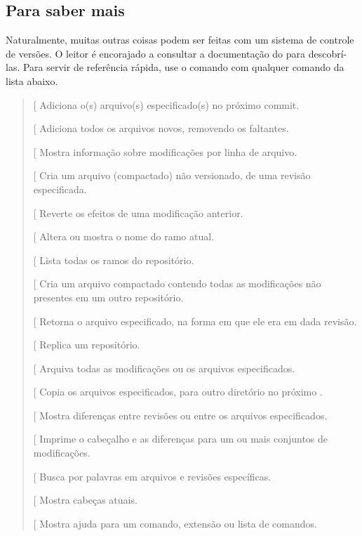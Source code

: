 \documentclass[a4paper,10pt,brazil]{sphinxmanual}
\begin{document}
\subsection{Para saber mais}
\label{capferr:para-saber-mais}
Naturalmente, muitas outras coisas podem ser feitas com um sistema
de controle de versões. O leitor é encorajado a consultar a
documentação do  para descobrí-las. Para servir de
referência rápida, use o comando  com
qualquer comando da lista abaixo.
\begin{quote}

{[}\code{add}{]} Adiciona o(s) arquivo(s) especificado(s) no próximo
commit.

{[}\code{addremove}{]} Adiciona todos os arquivos novos, removendo os
faltantes.

{[}\code{annotate}{]} Mostra informação sobre modificações por linha de
arquivo.

{[}\code{archive}{]} Cria um arquivo (compactado) não versionado, de uma
revisão especificada.

{[}\code{backout}{]} Reverte os efeitos de uma modificação anterior.

{[}\code{branch}{]} Altera ou mostra o nome do ramo atual.

{[}\code{branches}{]} Lista todas os ramos do repositório.

{[}\code{bundle}{]} Cria um arquivo compactado contendo todas as
modificações não presentes em um outro repositório.

{[}\code{cat}{]} Retorna o arquivo especificado, na forma em que ele era
em dada revisão.

{[}\code{clone}{]} Replica um repositório.

{[}\code{commit}{]} Arquiva todas as modificações ou os arquivos
especificados.

{[}\code{copy}{]} Copia os arquivos especificados, para outro diretório no
próximo .

{[}\code{diff}{]} Mostra diferenças entre revisões ou entre os arquivos
especificados.

{[}\code{export}{]} Imprime o cabeçalho e as diferenças para um ou mais
conjuntos de modificações.

{[}\code{grep}{]} Busca por palavras em arquivos e revisões específicas.

{[}\code{heads}{]} Mostra cabeças atuais.

{[}\code{help}{]} Mostra ajuda para um comando, extensão ou lista de
comandos.


\end{quote}
\end{document}

